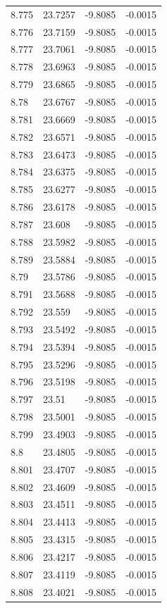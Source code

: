 \begin{tabular}{llll}
8.775 & 23.7257 & -9.8085 & -0.0015 \\
8.776 & 23.7159 & -9.8085 & -0.0015 \\
8.777 & 23.7061 & -9.8085 & -0.0015 \\
8.778 & 23.6963 & -9.8085 & -0.0015 \\
8.779 & 23.6865 & -9.8085 & -0.0015 \\
8.78 & 23.6767 & -9.8085 & -0.0015 \\
8.781 & 23.6669 & -9.8085 & -0.0015 \\
8.782 & 23.6571 & -9.8085 & -0.0015 \\
8.783 & 23.6473 & -9.8085 & -0.0015 \\
8.784 & 23.6375 & -9.8085 & -0.0015 \\
8.785 & 23.6277 & -9.8085 & -0.0015 \\
8.786 & 23.6178 & -9.8085 & -0.0015 \\
8.787 & 23.608 & -9.8085 & -0.0015 \\
8.788 & 23.5982 & -9.8085 & -0.0015 \\
8.789 & 23.5884 & -9.8085 & -0.0015 \\
8.79 & 23.5786 & -9.8085 & -0.0015 \\
8.791 & 23.5688 & -9.8085 & -0.0015 \\
8.792 & 23.559 & -9.8085 & -0.0015 \\
8.793 & 23.5492 & -9.8085 & -0.0015 \\
8.794 & 23.5394 & -9.8085 & -0.0015 \\
8.795 & 23.5296 & -9.8085 & -0.0015 \\
8.796 & 23.5198 & -9.8085 & -0.0015 \\
8.797 & 23.51 & -9.8085 & -0.0015 \\
8.798 & 23.5001 & -9.8085 & -0.0015 \\
8.799 & 23.4903 & -9.8085 & -0.0015 \\
8.8 & 23.4805 & -9.8085 & -0.0015 \\
8.801 & 23.4707 & -9.8085 & -0.0015 \\
8.802 & 23.4609 & -9.8085 & -0.0015 \\
8.803 & 23.4511 & -9.8085 & -0.0015 \\
8.804 & 23.4413 & -9.8085 & -0.0015 \\
8.805 & 23.4315 & -9.8085 & -0.0015 \\
8.806 & 23.4217 & -9.8085 & -0.0015 \\
8.807 & 23.4119 & -9.8085 & -0.0015 \\
8.808 & 23.4021 & -9.8085 & -0.0015 \\

\end{tabular}
